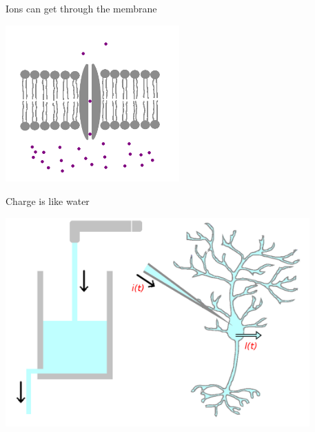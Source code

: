 \documentclass{beamer}
\begin{document}
\begin{frame}{Ions can get through the membrane}
  \begin{center}
    \includegraphics[height=6cm]{passive_channel.png}
  \end{center}
\end{frame}

\begin{frame}{Charge is like water}
  \begin{center}
    \includegraphics[height=8cm]{glass_neuron.png}
  \end{center}
\end{frame}
\end{document}
